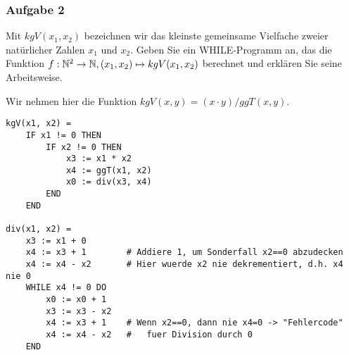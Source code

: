 \subsubsection*{Aufgabe 2}
    Mit $kgV(x_{1}, x_{2})$ bezeichnen wir das kleinste gemeinsame Vielfache zweier natürlicher Zahlen $x_{1}$ und $x_{2}$. Geben Sie ein WHILE-Programm an, das die Funktion $f: \mathbb{N}^{2} \to \mathbb{N}, (x_{1}, x_{2}) \mapsto kgV(x_{1}, x_{2})$ berechnet und erklären Sie seine Arbeitsweise.

    \LOES Wir nehmen hier die Funktion $kgV(x,y) = (x \cdot y) / ggT(x, y)$.
    \begin{lstlisting}
kgV(x1, x2) =
    IF x1 != 0 THEN
        IF x2 != 0 THEN
            x3 := x1 * x2
            x4 := ggT(x1, x2)
            x0 := div(x3, x4)
        END
    END

div(x1, x2) =
    x3 := x1 + 0
    x4 := x3 + 1        # Addiere 1, um Sonderfall x2==0 abzudecken
    x4 := x4 - x2       # Hier wuerde x2 nie dekrementiert, d.h. x4 nie 0
    WHILE x4 != 0 DO
        x0 := x0 + 1
        x3 := x3 - x2
        x4 := x3 + 1    # Wenn x2==0, dann nie x4=0 -> "Fehlercode"
        x4 := x4 - x2   #   fuer Division durch 0
    END
    \end{lstlisting}


